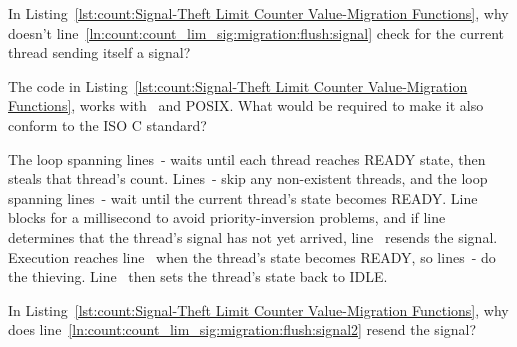 \QuickQuiz{}
	In Listing~\ref{lst:count:Signal-Theft Limit Counter Value-Migration Functions},
	why doesn't
        line~\ref{ln:count:count_lim_sig:migration:flush:signal}
        check for the current thread sending itself
	a signal?
 \QuickQuizEnd

\QuickQuiz{}
	The code in
	Listing~\ref{lst:count:Signal-Theft Limit Counter Value-Migration Functions},
	works with \GCC\ and POSIX.
	What would be required to make it also conform to the ISO C standard?
 \QuickQuizEnd

\begin{lineref}
The loop spanning lines~- waits until each
thread reaches READY state,
then steals that thread's count.
Lines~- skip any non-existent threads,
and the loop spanning
lines~- wait until the current
thread's  state becomes READY.
Line~ blocks for a millisecond to avoid priority-inversion problems,
and if line~ determines that the thread's signal has not yet arrived,
line~ resends the signal.
Execution reaches line~ when the thread's  state becomes
READY, so lines~- do the thieving.
Line~ then sets the thread's  state back to IDLE.
\end{lineref}

\QuickQuiz{}
	In Listing~\ref{lst:count:Signal-Theft Limit Counter Value-Migration Functions},
        why does line~\ref{ln:count:count_lim_sig:migration:flush:signal2}
        resend the signal?
 \QuickQuizEnd


